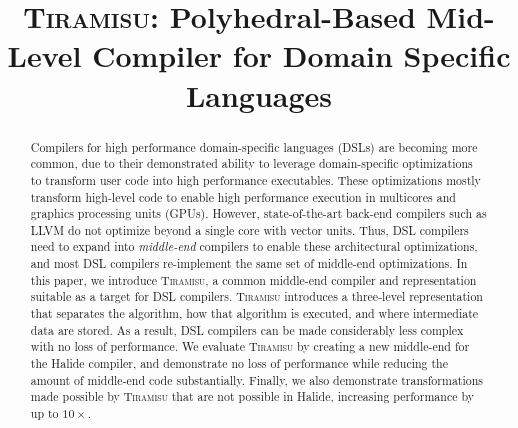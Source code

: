 \documentclass[preprint,10pt,numbers]{sigplanconf}
\newcommand\TODO[1]{{\color{red}\textbf{TODO: }#1}}
\newcommand\framework{\textsc{Tiramisu}\xspace}
\begin{document}
\setlength{\pdfpageheight}{\paperheight}
\setlength{\pdfpagewidth}{\paperwidth}



\titlebanner{}        %
\preprintfooter{}   %

\title{\framework{}: Polyhedral-Based Mid-Level Compiler for Domain Specific Languages}
\subtitle{}

\authorinfo{}
           {}
           {}

\maketitle

\begin{abstract}

Compilers for high performance domain-specific languages (DSLs) are becoming more common,
due to their demonstrated ability to leverage domain-specific optimizations to transform
user code into high performance executables.  These optimizations
mostly transform high-level code to enable high performance execution in multicores and graphics processing
units (GPUs). However, state-of-the-art back-end compilers such as LLVM do not optimize beyond a single core with vector units.  Thus, DSL compilers need to expand into \emph{middle-end} compilers to enable these architectural optimizations,
and most DSL compilers re-implement the same set of middle-end optimizations.  In this paper,
we introduce \framework{}, a common middle-end compiler and representation suitable as a
target for DSL compilers.  \framework{} introduces a three-level representation that separates the
algorithm, how that algorithm is executed, and where intermediate data are stored.  As a result,
DSL compilers can be made considerably less complex with no loss of performance.  We evaluate
\framework by creating a new middle-end for the Halide compiler, and demonstrate no loss of performance
while reducing the amount of middle-end code substantially.  Finally, we also demonstrate
transformations made possible by \framework that are not possible in Halide, increasing performance
by up to $10\times$.

\end{abstract}
\end{document}

